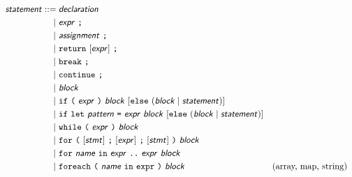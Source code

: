 \begin{align*}
\ty{statement} ::={}& \ty{declaration} \\
  |~& \ty{expr}~\ic{;} \\
  |~& \ty{assignment}~\ic{;} \\
  |~& \ic{return}~[\ty{expr}]~\ic{;} \\
  |~& \ic{break}~\ic{;} \\
  |~& \ic{continue}~\ic{;} \\
  |~& \ty{block} \\
  |~& \ic{if}~\ic{(}~\ty{expr}~\ic{)}~\ty{block}~[\ic{else}~(\ty{block} \mid \ty{statement})] \\
  |~& \ic{if}~\ic{let}~\ty{pattern}~\ic{=}~\ty{expr}~\ty{block}
        ~[\ic{else}~(\ty{block} \mid \ty{statement})] \\
  |~& \ic{while}~\ic{(}~\ty{expr}~\ic{)}~\ty{block} \\
  |~& \ic{for}~\ic{(}~[\ty{stmt}]~\ic{;}~[\ty{expr}]~\ic{;}~[\ty{stmt}]~\ic{)}~\ty{block} \\
  |~& \ic{for}~\ty{name}~\ic{in}~\ty{expr}~\ic{..}~\ty{expr}~\ty{block} \\
  |~& \ic{foreach}~\ic{(}~\ty{name}~\ic{in}~\ic{expr}~\ic{)}~\ty{block}
       && \text{(array, map, string)}
\end{align*}

